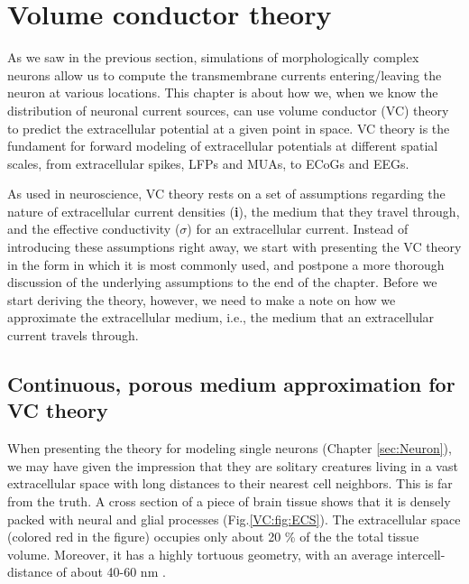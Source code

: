 \section{Volume conductor theory}
\label{sec:VC}


As we saw in the previous section, simulations of morphologically complex neurons allow us to compute the transmembrane currents entering/leaving the neuron at various locations. This chapter is about how we, when we know the distribution of neuronal current sources, can use volume conductor (VC) theory to predict the extracellular potential at a given point in space. VC theory is the fundament for forward modeling of extracellular potentials at different spatial scales, from extracellular spikes, LFPs and MUAs, to ECoGs and EEGs.

As  used in neuroscience, VC theory rests on a set of assumptions regarding the nature of extracellular current densities ({\bf i}), the medium that they travel through, and the effective conductivity ($\sigma$) for an extracellular current. Instead of introducing these assumptions right away, we start with presenting the VC theory in the form in which it is most commonly used, and postpone a more thorough discussion of the underlying assumptions to the end of the chapter. Before we start deriving the theory, however, we need to make a note on how we approximate the extracellular medium, i.e., the medium that an extracellular current travels through.


\subsection{Continuous, porous medium approximation for VC theory}
\label{sec:continuous}
When presenting the theory for modeling single neurons (Chapter \ref{sec:Neuron}), we may have given the impression that they are solitary creatures living in a vast extracellular space with long distances to their nearest cell neighbors. This is far from the truth. A cross section of a piece of brain tissue shows that it is densely packed with neural and glial processes (Fig.\ref{VC:fig:ECS}). The extracellular space (colored red in the figure) occupies only about 20 \% of the the total tissue volume. Moreover, it has a highly tortuous geometry, with an average intercell-distance of about 40-60 nm \citep{Sykova2008}. 


